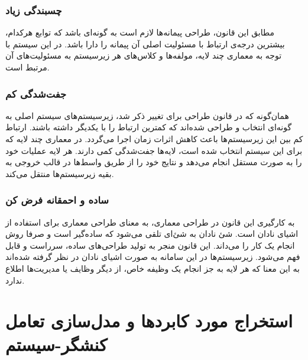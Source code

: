 \documentclass[12pt]{article}
\begin{document}
	\subsubsection{چسبندگی زیاد}
	مطابق این قانون، طراحی پیمانه‌ها لازم است به گونه‌ای باشد که توابع هر‌کدام، بیشترین درجه‌ی ارتباط با مسئولیت اصلی آن پیمانه را دارا باشد. در این سیستم با توجه به معماری چند لایه، مولفه‌ها و کلاس‌های هر زیرسیستم به مسئولیت‌های آن مرتبط است.

	\subsubsection{جفت‌شدگی کم}
	همان‌گونه که در قانون طراحی برای تغییر ذکر شد، زیرسیستم‌های سیستم اصلی به گونه‌ای انتخاب و طراحی شده‌اند که کمترین ارتباط را با یکدیگر داشته باشند. ارتباط کم بین این زیرسیستم‌ها باعث کاهش اثرات زمان اجرا می‌گردد.
	در معماری چند لایه که برای این سیستم انتخاب شده است، لایه‌ها جفت‌شدگی کمی دارند. هر لایه عملیات خود را به صورت مستقل انجام می‌دهد و نتایج خود را از طریق واسط‌ها در قالب خروجی به بقیه زیرسیستم‌ها منتقل می‌کند.

	\subsubsection{ساده و احمقانه فرض کن}
	به کارگیری این قانون در طراحی معماری، به معنای طراحی معماری برای استفاده از اشیای نادان است. شئ نادان به شئ‌ای تلقی می‌شود که ساده‌گیر است و صرفا روش انجام یک کار را می‌داند. این قانون منجر به تولید طراحی‌های ساده، سرراست و قابل فهم می‌شود. زیرسیستم‌ها در این سامانه به صورت اشیای نادان در نظر گرفته شده‌اند به این معنا که هر لایه به جز انجام یک وظیفه خاص، از دیگر وظایف یا مدیریت‌ها اطلاع ندارد.

	\newpage
	\section{استخراج مورد کابردها و مدل‌سازی تعامل کنشگر-سیستم}
\end{document}
